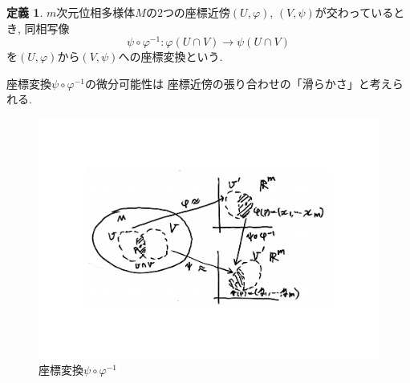 \documentclass[dvipdfmx,cjk]{beamer}
\theoremstyle{definition}
\newtheorem{ex}{\textbf{ 例 }}
\newtheorem{dfn}{\textbf{ 定義 }}
\begin{document}
\begin{frame}
  \frametitle{}
  \begin{dfn}
    $m$次元位相多様体$M$の$2$つの座標近傍$(U, \varphi)$, 
    $(V, \psi)$が交わっているとき, 同相写像
    $$\psi \circ \varphi^{-1}:\varphi(U\cap V)\rightarrow \psi(U\cap V)$$
    を$(U, \varphi)$から$(V, \psi)$への座標変換という. 
\end{dfn}
座標変換$\psi \circ \varphi^{-1}$の微分可能性は
座標近傍の張り合わせの「滑らかさ」と考えられる. 
\begin{figure}[H]
    \centering
    \includegraphics[keepaspectratio, scale=0.3]{coordinateConversionBig.pdf}
    \caption{座標変換$\psi \circ \varphi^{-1}$}
    \label{coordinateConversion}
   \end{figure}
\end{frame}
\end{document}
